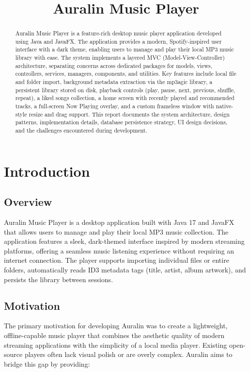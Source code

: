 ﻿\documentclass[12pt]{report}
\title{Auralin Music Player}
\begin{document}
    

    \begin{abstract}
    Auralin Music Player is a feature-rich desktop music player application developed using Java and JavaFX. The application provides a modern, Spotify-inspired user interface with a dark theme, enabling users to manage and play their local MP3 music library with ease. The system implements a layered MVC (Model-View-Controller) architecture, separating concerns across dedicated packages for models, views, controllers, services, managers, components, and utilities. Key features include local file and folder import, background metadata extraction via the mp3agic library, a persistent library stored on disk, playback controls (play, pause, next, previous, shuffle, repeat), a liked songs collection, a home screen with recently played and recommended tracks, a full-screen Now Playing overlay, and a custom frameless window with native-style resize and drag support. This report documents the system architecture, design patterns, implementation details, database persistence strategy, UI design decisions, and the challenges encountered during development.
    \end{abstract}

    \tableofcontents


\newpage
\chapter{Introduction}

\section{Overview}
Auralin Music Player is a desktop application built with Java 17 and JavaFX that allows users to manage and play their local MP3 music collection. The application features a sleek, dark-themed interface inspired by modern streaming platforms, offering a seamless music listening experience without requiring an internet connection. The player supports importing individual files or entire folders, automatically reads ID3 metadata tags (title, artist, album artwork), and persists the library between sessions.

\section{Motivation}
The primary motivation for developing Auralin was to create a lightweight, offline-capable music player that combines the aesthetic quality of modern streaming applications with the simplicity of a local media player. Existing open-source players often lack visual polish or are overly complex. Auralin aims to bridge this gap by providing:
\end{document}
